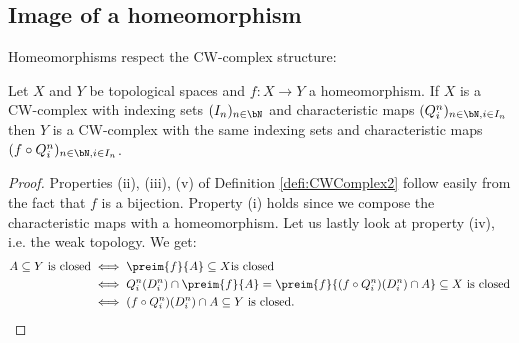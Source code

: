 \subsection{Image of a homeomorphism}

Homeomorphisms respect the CW-complex structure: 

\begin{lem} \label{lem:homeomorph}
    Let $X$ and $Y$ be topological spaces and $f \colon X \to Y$ a homeomorphism. 
    If $X$ is a CW-complex with indexing sets $(I_n)_{n \in \bN}$ and characteristic maps $(Q_i^n)_{n \in \bN, i \in I_n}$ then $Y$ is a CW-complex with the same indexing sets and characteristic maps $(f \circ Q_i^n)_{n \in \bN, i \in I_n}$.
\end{lem}
\begin{proof}
    Properties (ii), (iii), (v) of Definition \ref{defi:CWComplex2} follow easily from the fact that $f$ is a bijection. 
    Property (i) holds since we compose the characteristic maps with a homeomorphism. 
    Let us lastly look at property (iv), i.e. the weak topology. 
    We get: 
    \begin{equation*}
        \begin{split}
            A \subseteq Y \text{ is closed} &\iff \preim{f}{A} \subseteq X \text {is closed} \\
            &\iff Q_i^n(D_i^n) \cap \preim{f}{A} = \preim{f}{(f \circ Q_i^n)(D_i^n) \cap A} \subseteq X \text{ is closed} \\ 
            &\iff (f \circ Q_i^n)(D_i^n) \cap A \subseteq Y \text{ is closed}.
        \end{split}
    \end{equation*}
\end{proof}